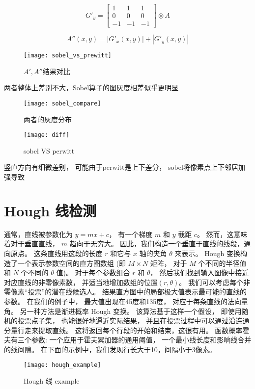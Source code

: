 \documentclass{myreport}
\begin{document}
      $$
        G'_y = \begin{bmatrix}
            1 & 1 & 1 \\
            0 & 0 & 0 \\
            -1 & -1 & -1
        \end{bmatrix}
        \circledast A 
      $$
      
      $$
        A''(x,y) = |G'_x(x,y)| + |G'_y(x,y)| 
      $$

      \begin{figure}[H]
        \centering
        \texttt{[image: sobel\_vs\_prewitt]}
        \caption{$A',A''$结果对比}
        \label{fig:sobel_compare}
      \end{figure}
      两者整体上差别不大，Sobel算子的图灰度相差似乎更明显
      \begin{figure}[H]
        \centering
        \texttt{[image: sobel\_compare]}
        \caption{两者的灰度分布}
        \label{fig:sobel_compare}
      \end{figure}
   
      \begin{figure}[H]
        \centering
        \texttt{[image: diff]}
        \caption{sobel VS perwitt}
        \label{fig:diff}
      \end{figure}
      竖直方向有细微差别，
      可能由于perwitt是上下差分，
      sobel将像素点上下邻居加强导致

\section{Hough 线检测}
  通常，直线被参数化为 $y = mx + c$，
  有一个梯度 $m$ 和 $y$ 截距 $c$。
  然而，这意味着对于垂直直线，
  $m$ 趋向于无穷大。
  因此，我们构造一个垂直于直线的线段，通向原点。
  这条直线用这段的长度 $r$ 和它与 $x$ 轴的夹角 $\theta$ 
  来表示。
  Hough 变换构造了一个表示参数空间的直方图数组
  (即 $M \times N$ 矩阵，
  对于 $M$ 个不同的半径值和 $N$ 个不同的 $\theta$ 值)。
  对于每个参数组合 $r$ 和 $\theta$，
  然后我们找到输入图像中接近对应直线的非零像素数，
  并适当地增加数组的位置$(r,\theta)$。
  我们可以考虑每个非零像素“投票”的潜在线候选人。
  结果直方图中的局部极大值表示最可能的直线的参数。
  在我们的例子中，
  最大值出现在45度和135度，
  对应于每条直线的法向量角。
  另一种方法是渐进概率 Hough 变换。
  该算法基于这样一个假设，
  即使用随机的投票点子集，
  也能很好地逼近实际结果，
  并且在投票过程中可以通过沿连通分量行走来提取直线。
  这将返回每个行段的开始和结束，这很有用。
  函数概率霍夫有三个参数: 
  一个应用于霍夫累加器的通用阈值，
  一个最小线长度和影响线合并的线间隙。
  在下面的示例中，我们发现行长大于10，间隔小于3像素。
  \begin{figure}[H]
    \centering
    \texttt{[image: hough\_example]}
    \caption{Hough 线 example}
    \label{fig:hough}
  \end{figure}
\end{document}
